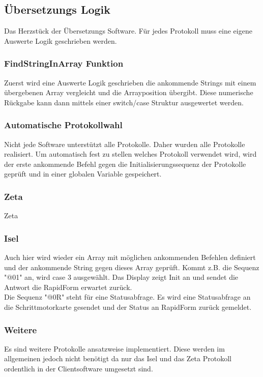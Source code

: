\subsection{Übersetzungs Logik}
Das Herzstück der Übersetzungs Software. Für jedes Protokoll muss eine eigene Auswerte Logik geschrieben werden. 
\subsubsection{FindStringInArray Funktion}
Zuerst wird eine Auswerte Logik geschrieben die ankommende Strings mit einem übergebenen Array vergleicht und die Arrayposition übergibt. Diese numerische Rückgabe kann dann mittels einer switch/case Struktur ausgewertet werden.
\lstset{language=C, basicstyle=\footnotesize, showstringspaces=false, tabsize=8}

\subsubsection{Automatische Protokollwahl}
Nicht jede Software unterstützt alle Protokolle. Daher wurden alle Protokolle realisiert. Um automatisch fest zu stellen welches Protokoll verwendet wird, wird der erste ankommende Befehl gegen die Initialisierungssequenz der Protokolle geprüft und in einer globalen Variable gespeichert.
\lstset{language=C, basicstyle=\footnotesize, showstringspaces=false, tabsize=8}

\subsubsection{Zeta}
Zeta
\subsubsection{Isel}
Auch hier wird wieder ein Array mit möglichen ankommenden Befehlen definiert und der ankommende String gegen dieses Array geprüft. Kommt z.B. die Sequenz "@01" an, wird case 3 ausgewählt. Das Display zeigt Init an und sendet die Antwort die RapidForm erwartet zurück.\\
Die Sequenz "@0R" steht für eine Statusabfrage. Es wird eine Statusabfrage an die Schrittmotorkarte gesendet und der Status an RapidForm zurück gemeldet.
\lstset{language=C, basicstyle=\footnotesize, showstringspaces=false, tabsize=8}

\subsubsection{Weitere}
Es sind weitere Protokolle ansatzweise implementiert. Diese werden im allgemeinen jedoch nicht benötigt da nur das Isel und das Zeta Protokoll ordentlich in der Clientsoftware umgesetzt sind.